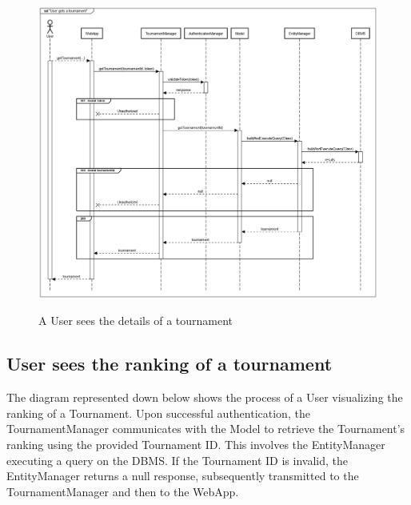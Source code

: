 \documentclass{Configuration_Files/Template}
\begin{document}
\begin{figure}[H]
\centering
\includegraphics[scale = 0.33]{Images/diagrams/sequences/GetTournament.png}\\
\caption{A User sees the details of a tournament}
\end{figure}

\subsection{User sees the ranking of a tournament}

The diagram represented down below shows the process of a User visualizing the ranking of a Tournament. Upon successful authentication, the TournamentManager communicates with the Model to retrieve the Tournament's ranking using the provided Tournament ID. This involves the EntityManager executing a query on the DBMS. If the Tournament ID is invalid, the EntityManager returns a null response, subsequently transmitted to the TournamentManager and then to the WebApp.
\end{document}

